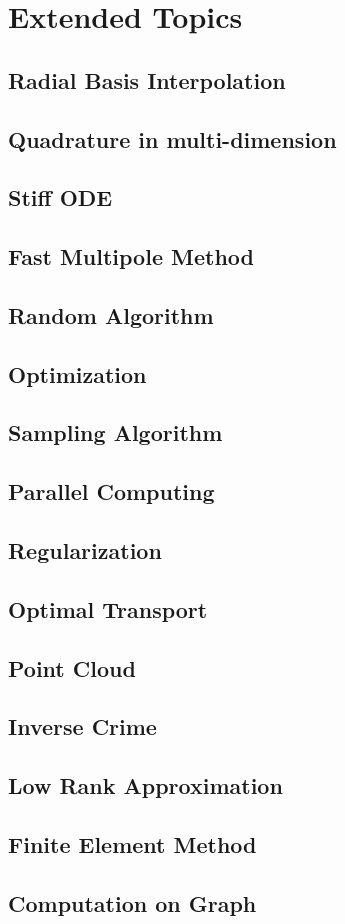 \chapter{Extended Topics}

\section{Radial Basis Interpolation}

\section{Quadrature in multi-dimension}

\section{Stiff ODE}

\section{Fast Multipole Method}

\section{Random Algorithm}

\section{Optimization}

\section{Sampling Algorithm}

\section{Parallel Computing}

\section{Regularization}

\section{Optimal Transport}

\section{Point Cloud}

\section{Inverse Crime}

\section{Low Rank Approximation}

\section{Finite Element Method}

\section{Computation on Graph}